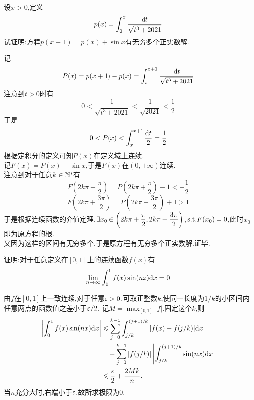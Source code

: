 \documentclass{ctexart}
\begin{document}
\begin{problem}[4.(20\songti{分})]
    设$x>0$,定义$$p(x)=\int_0^x\dfrac{\mathrm{d} t}{\sqrt{t^3+2021}}$$
    试证明:方程$p(x+1)=p(x)+\sin x$有无穷多个正实数解.
\end{problem}
\begin{solution}
    记$$P(x)=p(x+1)-p(x)=\int_x^{x+1}\dfrac{\mathrm{d} t}{\sqrt{t^3+2021}}$$
    注意到$t>0$时有$$0<\dfrac{1}{\sqrt{t^3+2021}}<\dfrac{1}{\sqrt{2021}}<\dfrac{1}{2}$$
    于是$$0<P(x)<\int_x^{x+1}\dfrac{\mathrm{d} t}{2}=\dfrac{1}{2}$$
    根据定积分的定义可知$P(x)$在定义域上连续.\\
    记$F(x)=P(x)-\sin x$,于是$F(x)$在$(0,+\infty)$连续.\\
    注意到对于任意$k\in\mathbb{N}^*$有
    $$F\left(2k\pi+\dfrac{\pi}{2}\right)=P\left(2k\pi+\dfrac{\pi}{2}\right)-1<-\dfrac{1}{2}$$
    $$F\left(2k\pi+\dfrac{3\pi}{2}\right)=P\left(2k\pi+\dfrac{3\pi}{2}\right)+1>1$$
    于是根据连续函数的介值定理,$\exists x_0\in\left(2k\pi+\dfrac{\pi}{2},2k\pi+\dfrac{3\pi}{2}\right),\text{s.t.} F(x_0)=0$,此时$x_0$即为原方程的根.\\
    又因为这样的区间有无穷多个,于是原方程有无穷多个正实数解.证毕.
\end{solution}
\begin{problem}[5.(15\songti{分})]
    证明:对于任意定义在$[0,1]$上的连续函数$f(x)$有$$\lim_{n\to\infty}\int_0^1f(x)\sin(nx)\mathrm{d} x=0$$
\end{problem}
\begin{solution}
由$f$在$[0,1]$上一致连续,对于任意$\varepsilon>0$,可取正整数$k$,使同一长度为$1/k$的小区间内任意两点的函数值之差小于$\varepsilon/2$.
    记$M=\max_{[0,1]}|f|$.固定这个$k$,则
    \[\begin{aligned}
        \left|\int_0^1f(x)\sin(nx)\mathrm{d} x\right|
        &\leqslant\sum_{j=0}^{k-1}\int_{j/k}^{(j+1)/k}|f(x)-f(j/k)|\mathrm{d} x\\
        &\quad+\sum_{j=0}^{k-1}|f(j/k)|\left|\int_{j/k}^{(j+1)/k}\sin(nx)\mathrm{d} x\right|\\
        &\leqslant\dfrac{\varepsilon}2+\dfrac{2Mk}{n}.
    \end{aligned}\]
    当$n$充分大时,右端小于$\varepsilon$.故所求极限为$0$.
\end{solution}
\end{document}

